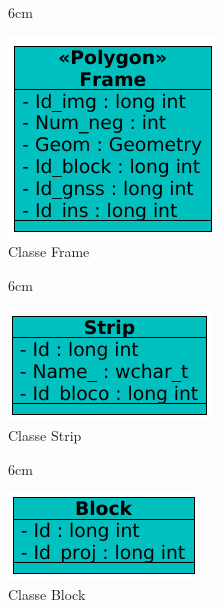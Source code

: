\begin{figure}[!ht]{6cm}
  \caption{Classe Frame} \label{fram}
  \centering
  \includegraphics[width=0.75\hsize]{figuras/2.png}
\end{figure}

\begin{figure}[!ht]{6cm}
  \caption{Classe Strip} \label{strip}
  \centering
  \includegraphics[width=0.7\hsize]{figuras/16.png}
\end{figure}

\begin{figure}[!ht]{6cm}
  \caption{Classe Block} \label{blo}
  \centering
  \includegraphics[width=0.65\hsize]{figuras/17.png}
\end{figure}

